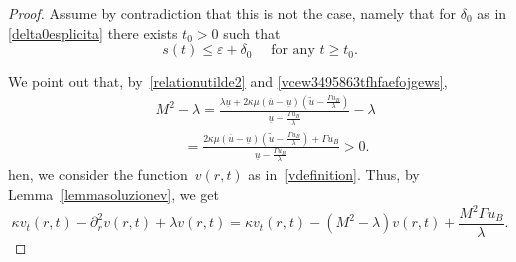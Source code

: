 \documentclass[12pt,a4paper,intlimits,sumlimits]{amsart}
\theoremstyle{definition}
\theoremstyle{plain}
\numberwithin{equation}{section}
\renewcommand{\le}{\leqslant}
\renewcommand{\ge}{\geqslant}
\begin{document}
\begin{proof}
Assume by contradiction that this is not the case, namely that for  $\delta_0$ as in \eqref{delta0esplicita} there exists $t_0>0$ such that
\begin{equation}\label{contrstep1}
s(t)\le\varepsilon+\delta_0 \quad\mbox{ for any } t\ge t_0.
\end{equation}

We point out that, by~\eqref{relationutilde2} and \eqref{vcew3495863tfhfaefojgews},
\begin{equation}\label{98765ujhygfhueoirshyor}\begin{split}&
M^2-\lambda=\frac{\lambda\underline{u} + 2\kappa\mu(\overline{u}-\underline{u})(\widetilde u-\frac{\Gamma u_B}{\lambda})}{\underline{u}-\frac{\Gamma u_B}{\lambda}}-\lambda
\\&\qquad=\frac{  2\kappa\mu(\overline{u}-\underline{u})(\widetilde u-\frac{\Gamma u_B}{\lambda})+\Gamma u_B}{\underline{u}-\frac{\Gamma u_B}{\lambda}}
>0.
\end{split}
\end{equation}
hen, we consider the function~$v(r, t)$ as in~\eqref{vdefinition}. Thus, by Lemma~\ref{lemmasoluzionev}, we get
\begin{equation}\label{mnbvc09876iuytrewjhgf0}
\kappa v_t(r, t)- \partial^2_r v(r, t) +\lambda v(r, t) = \kappa v_t(r, t)-(M^2-\lambda) v(r, t)+\frac{M^2\Gamma u_B}{\lambda}.
\end{equation}


\end{proof}
\end{document}
